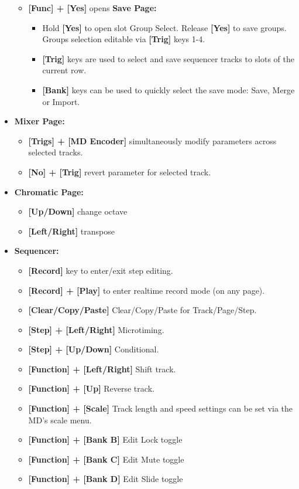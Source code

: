 \begin{itemize}
\begin{itemize}
\item \textbf{[Func] + [Yes]} opens \textbf{Save Page:}
    \begin{itemize}
    \item Hold \textbf{[Yes]} to open slot Group Select. Release \textbf{[Yes]} to save groups.  Groups selection editable via \textbf{[Trig]} keys 1-4.
    \item \textbf{[Trig]} keys are used to select and save sequencer tracks to slots of the current row.
    \item \textbf{[Bank]} keys can be used to quickly select the save mode: Save, Merge or Import.
    \end{itemize}
\end{itemize}

\item \textbf{Mixer Page:}
      \begin{itemize}
       \item \textbf{[Trigs] + [MD Encoder]} simultaneously modify parameters across selected tracks. 
      \item \textbf{[No] + [Trig]} revert parameter for selected track.
       \end{itemize}

\item \textbf{Chromatic Page:}
      \begin{itemize}
      \item \textbf{[Up/Down]} change octave
      \item \textbf{[Left/Right]} transpose
      \end{itemize}

\item \textbf{Sequencer:}
\begin{itemize}
      \item \textbf{[Record]} key to enter/exit step editing.
      \item \textbf{[Record] + [Play]} to enter realtime record mode (on any page).
      \item \textbf{[Clear/Copy/Paste]} Clear/Copy/Paste for Track/Page/Step.
      \item \textbf{[Step] + [Left/Right]} Microtiming.
      \item \textbf{[Step] + [Up/Down]} Conditional.
      \item \textbf{[Function] + [Left/Right]} Shift track.
      \item \textbf{[Function] + [Up]} Reverse track.
      \item \textbf{[Function] + [Scale]} Track length and speed settings can be set via the MD's scale menu.
      \item \textbf{[Function] + [Bank B]} Edit Lock toggle
      \item \textbf{[Function] + [Bank C]} Edit Mute toggle
      \item \textbf{[Function] + [Bank D]} Edit Slide toggle
\end{itemize}
\end{itemize}



